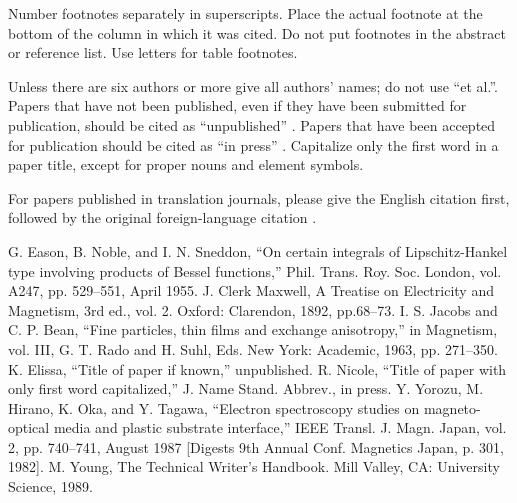 \documentclass[conference]{IEEEtran}
\begin{document}
Number footnotes separately in superscripts. Place the actual footnote at 
the bottom of the column in which it was cited. Do not put footnotes in the 
abstract or reference list. Use letters for table footnotes.

Unless there are six authors or more give all authors' names; do not use 
``et al.''. Papers that have not been published, even if they have been 
submitted for publication, should be cited as ``unpublished'' . Papers 
that have been accepted for publication should be cited as ``in press'' . 
Capitalize only the first word in a paper title, except for proper nouns and 
element symbols.

For papers published in translation journals, please give the English 
citation first, followed by the original foreign-language citation .

\begin{thebibliography}{00}
     G. Eason, B. Noble, and I. N. Sneddon, ``On certain integrals of Lipschitz-Hankel type involving products of Bessel functions,'' Phil. Trans. Roy. Soc. London, vol. A247, pp. 529--551, April 1955.
     J. Clerk Maxwell, A Treatise on Electricity and Magnetism, 3rd ed., vol. 2. Oxford: Clarendon, 1892, pp.68--73.
     I. S. Jacobs and C. P. Bean, ``Fine particles, thin films and exchange anisotropy,'' in Magnetism, vol. III, G. T. Rado and H. Suhl, Eds. New York: Academic, 1963, pp. 271--350.
     K. Elissa, ``Title of paper if known,'' unpublished.
     R. Nicole, ``Title of paper with only first word capitalized,'' J. Name Stand. Abbrev., in press.
     Y. Yorozu, M. Hirano, K. Oka, and Y. Tagawa, ``Electron spectroscopy studies on magneto-optical media and plastic substrate interface,'' IEEE Transl. J. Magn. Japan, vol. 2, pp. 740--741, August 1987 [Digests 9th Annual Conf. Magnetics Japan, p. 301, 1982].
     M. Young, The Technical Writer's Handbook. Mill Valley, CA: University Science, 1989.
\end{thebibliography}
\end{document}
